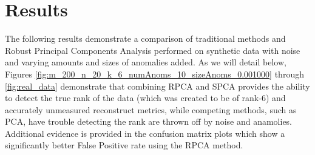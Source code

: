 \documentclass[conference]{IEEEtran}
\begin{document}
\section{Results}
\label{results}
The following results demonstrate a comparison of traditional methods and Robust Principal Components Analysis performed on synthetic data with noise and varying amounts and sizes of anomalies added.  As we will detail below, Figures \ref{fig:m_200_n_20_k_6_numAnoms_10_sizeAnoms_0.001000} through \ref{fig:real_data}
demonstrate that combining RPCA and SPCA provides the ability to detect the true rank of the data (which was created to be of rank-6) and accurately unmeasured reconstruct metrics, while competing methods, such as PCA, have trouble detecting the rank are thrown off by noise and anamolies.  Additional evidence is provided in the confusion matrix plots which show a significantly better False Positive rate using the RPCA method.
\end{document}
